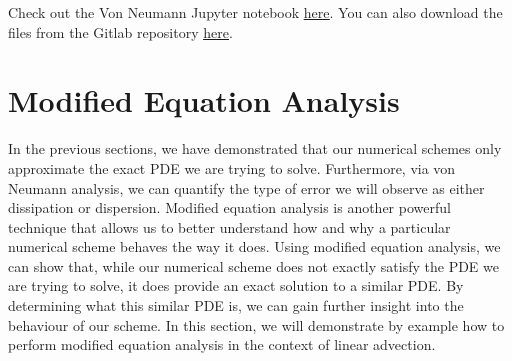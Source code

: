 \begin{jupyternote}
	Check out the Von Neumann Jupyter notebook \href{\binderurl}{\underline{here}}. You can also download the files from the Gitlab repository \href{\repourl}{\underline{here}}.
\end{jupyternote}
\chapter{Modified Equation Analysis}
In the previous sections, we have demonstrated that our numerical schemes only approximate the exact PDE we are trying to solve. Furthermore, via von Neumann analysis, we can quantify the type of error we will observe as either dissipation or dispersion. Modified equation analysis is another powerful technique that allows us to better understand how and why a particular numerical scheme behaves the way it does. Using modified equation analysis, we can show that, while our numerical scheme does not exactly satisfy the PDE we are trying to solve, it does provide an exact solution to a similar PDE. By determining what this similar PDE is, we can gain further insight into the behaviour of our scheme. In this section, we will demonstrate by example how to perform modified equation analysis in the context of linear advection.

